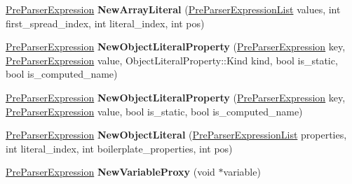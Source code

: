 \begin{DoxyCompactItemize}
\item 
\hyperlink{classv8_1_1internal_1_1_pre_parser_expression}{Pre\+Parser\+Expression} {\bfseries New\+Array\+Literal} (\hyperlink{classv8_1_1internal_1_1_pre_parser_list}{Pre\+Parser\+Expression\+List} values, int first\+\_\+spread\+\_\+index, int literal\+\_\+index, int pos)\hypertarget{classv8_1_1internal_1_1_pre_parser_factory_af216b276bca6ce4e202d63cf35d8a965}{}\label{classv8_1_1internal_1_1_pre_parser_factory_af216b276bca6ce4e202d63cf35d8a965}

\item 
\hyperlink{classv8_1_1internal_1_1_pre_parser_expression}{Pre\+Parser\+Expression} {\bfseries New\+Object\+Literal\+Property} (\hyperlink{classv8_1_1internal_1_1_pre_parser_expression}{Pre\+Parser\+Expression} key, \hyperlink{classv8_1_1internal_1_1_pre_parser_expression}{Pre\+Parser\+Expression} value, Object\+Literal\+Property\+::\+Kind kind, bool is\+\_\+static, bool is\+\_\+computed\+\_\+name)\hypertarget{classv8_1_1internal_1_1_pre_parser_factory_ae39073b3f8e5ac7e738e53e6a9a0a9ec}{}\label{classv8_1_1internal_1_1_pre_parser_factory_ae39073b3f8e5ac7e738e53e6a9a0a9ec}

\item 
\hyperlink{classv8_1_1internal_1_1_pre_parser_expression}{Pre\+Parser\+Expression} {\bfseries New\+Object\+Literal\+Property} (\hyperlink{classv8_1_1internal_1_1_pre_parser_expression}{Pre\+Parser\+Expression} key, \hyperlink{classv8_1_1internal_1_1_pre_parser_expression}{Pre\+Parser\+Expression} value, bool is\+\_\+static, bool is\+\_\+computed\+\_\+name)\hypertarget{classv8_1_1internal_1_1_pre_parser_factory_acccbaf75b3ce3e8ed1ec04245ef086ed}{}\label{classv8_1_1internal_1_1_pre_parser_factory_acccbaf75b3ce3e8ed1ec04245ef086ed}

\item 
\hyperlink{classv8_1_1internal_1_1_pre_parser_expression}{Pre\+Parser\+Expression} {\bfseries New\+Object\+Literal} (\hyperlink{classv8_1_1internal_1_1_pre_parser_list}{Pre\+Parser\+Expression\+List} properties, int literal\+\_\+index, int boilerplate\+\_\+properties, int pos)\hypertarget{classv8_1_1internal_1_1_pre_parser_factory_a6a8084b9ca7297964af965ec4cde764b}{}\label{classv8_1_1internal_1_1_pre_parser_factory_a6a8084b9ca7297964af965ec4cde764b}

\item 
\hyperlink{classv8_1_1internal_1_1_pre_parser_expression}{Pre\+Parser\+Expression} {\bfseries New\+Variable\+Proxy} (void $\ast$variable)\hypertarget{classv8_1_1internal_1_1_pre_parser_factory_a5f4355f77f1a41bcb6b55fa0e98bec08}{}\label{classv8_1_1internal_1_1_pre_parser_factory_a5f4355f77f1a41bcb6b55fa0e98bec08}


\end{DoxyCompactItemize}
